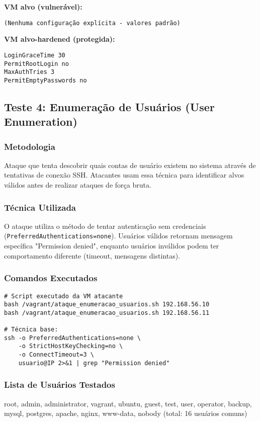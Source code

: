 \documentclass[12pt]{article}
\begin{document}
\textbf{VM alvo (vulnerável):}
\begin{verbatim}
(Nenhuma configuração explícita - valores padrão)
\end{verbatim}

\textbf{VM alvo-hardened (protegida):}
\begin{verbatim}
LoginGraceTime 30
PermitRootLogin no
MaxAuthTries 3
PermitEmptyPasswords no
\end{verbatim}

\subsection{Teste 4: Enumeração de Usuários (User Enumeration)}

\subsubsection{Metodologia}
Ataque que tenta descobrir quais contas de usuário existem no sistema através de tentativas de conexão SSH. Atacantes usam essa técnica para identificar alvos válidos antes de realizar ataques de força bruta.

\subsubsection{Técnica Utilizada}
O ataque utiliza o método de tentar autenticação sem credenciais (\texttt{PreferredAuthentications=none}). Usuários válidos retornam mensagem específica "Permission denied", enquanto usuários inválidos podem ter comportamento diferente (timeout, mensagens distintas).

\subsubsection{Comandos Executados}
\begin{verbatim}
# Script executado da VM atacante
bash /vagrant/ataque_enumeracao_usuarios.sh 192.168.56.10
bash /vagrant/ataque_enumeracao_usuarios.sh 192.168.56.11

# Técnica base:
ssh -o PreferredAuthentications=none \
    -o StrictHostKeyChecking=no \
    -o ConnectTimeout=3 \
    usuario@IP 2>&1 | grep "Permission denied"
\end{verbatim}

\subsubsection{Lista de Usuários Testados}
root, admin, administrator, vagrant, ubuntu, guest, test, user, operator, backup, mysql, postgres, apache, nginx, www-data, nobody (total: 16 usuários comuns)
\end{document}

